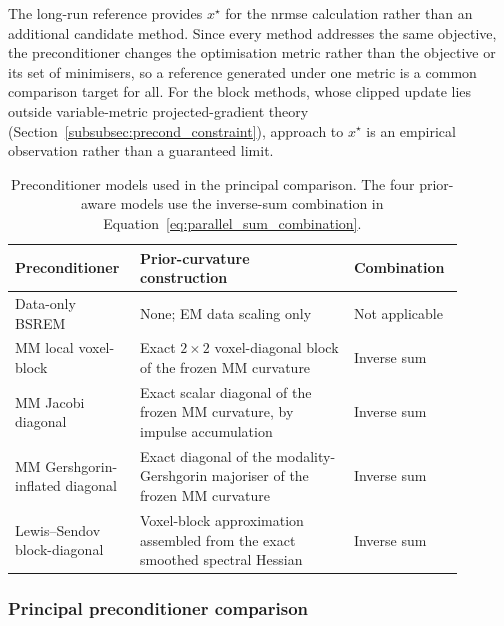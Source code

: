 The long-run reference provides $x^\star$ for the \gls{nrmse} calculation rather than an additional candidate method. Since every method addresses the same objective, the preconditioner changes the optimisation metric rather than the objective or its set of minimisers, so a reference generated under one metric is a common comparison target for all. For the block methods, whose clipped update lies outside variable-metric projected-gradient theory (Section~\ref{subsubsec:precond_constraint}), approach to $x^\star$ is an empirical observation rather than a guaranteed limit.

\begin{table}[htbp]
\centering
\caption{Preconditioner models used in the principal comparison. The four prior-aware models use the inverse-sum combination in Equation~\eqref{eq:parallel_sum_combination}.}
\label{tab:preconditioner_settings}
\small
\begin{tabular}{p{0.25\linewidth}p{0.45\linewidth}p{0.19\linewidth}}
\toprule
Preconditioner & Prior-curvature construction & Combination\\
\midrule
Data-only BSREM & None; EM data scaling only & Not applicable\\
MM local voxel-block & Exact $2\times2$ voxel-diagonal block of the frozen MM curvature & Inverse sum\\
MM Jacobi diagonal & Exact scalar diagonal of the frozen MM curvature, by impulse accumulation & Inverse sum\\
MM Gershgorin-inflated diagonal & Exact diagonal of the modality-Gershgorin majoriser of the frozen MM curvature & Inverse sum\\
Lewis--Sendov block-diagonal & Voxel-block approximation assembled from the exact smoothed spectral Hessian & Inverse sum\\
\bottomrule
\end{tabular}
\end{table}

\subsubsection{Principal preconditioner comparison}

